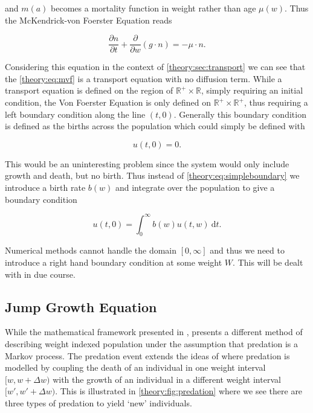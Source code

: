 \documentclass[../main.tex]{subfiles}
\begin{document}
  and $m(a)$ becomes a mortality function in weight rather than age $\mu(w)$. Thus the McKendrick-von Foerster Equation reads

  \begin{equation}\label{theory:eq:mvf}
    \frac{\partial n}{\partial t} + \frac{\partial}{\partial w} \left(g \cdot n \right) = - \mu \cdot n.
  \end{equation}

  Considering this equation in the context of \autoref{theory:sec:transport} we can see that the \autoref{theory:eq:mvf} is a transport equation with no diffusion term. While a transport equation is defined on the region of $\mathbb{R^+} \times \mathbb{R}$, simply requiring an initial condition, the Von Foerster Equation is only defined on $\mathbb{R^+} \times \mathbb{R^+}$, thus requiring a left boundary condition along the line $(t, 0)$. Generally this boundary condition is defined as the births across the population which could simply be defined with

  \begin{equation}\label{theory:eq:simpleboundary}
    u(t, 0) = 0.
  \end{equation}

  This would be an uninteresting problem since the system would only include growth and death, but no birth. Thus instead of \autoref{theory:eq:simpleboundary} we introduce a birth rate $b(w)$ and integrate over the population to give a boundary condition

  \begin{equation}\label{theory:eq:boundary}
    u(t, 0) = \int_0^{\infty} b(w) u(t, w) \: \mathrm{d}t.
  \end{equation}

  Numerical methods cannot handle the domain $[0, \infty]$ and thus we need to introduce a right hand boundary condition at some weight $W$. This will be dealt with in due course.

  \subsection{Jump Growth Equation}\label{theory:sec:jumpgrowth}
  While the mathematical framework presented in \cite{silvert1978}, \cite{datta2010} presents a different method of describing weight indexed population under the assumption that predation is a Markov process. The predation event extends the ideas of \cite{silvert1980} where predation is modelled by coupling the death of an individual in one weight interval $[w, w + \Delta w)$ with the growth of an individual in a different weight interval $[w', w' + \Delta w)$. This is illustrated in \autoref{theory:fig:predation} where we see there are three types of predation to yield `new' individuals.
\end{document}
